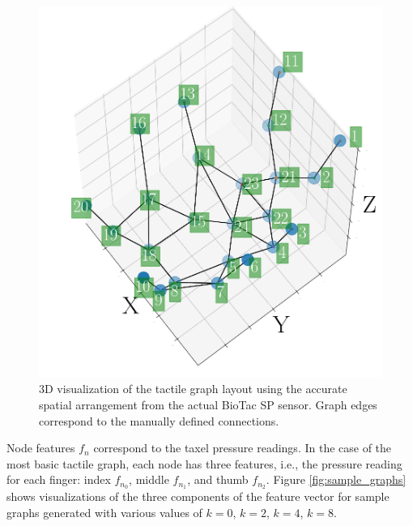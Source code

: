 \begin{figure}[!htb]
	\centering
    \includegraphics[width=0.8\linewidth]{Figures/Tactile/plot3d.png}
	\caption{3D visualization of the tactile graph layout using the accurate spatial arrangement from the actual BioTac SP sensor. Graph edges correspond to the manually defined connections.}
	\label{fig:graph_3d}
\end{figure}

Node features $f_n$ correspond to the taxel pressure readings. In the case of the most basic tactile graph, each node has three features, i.e., the pressure reading for each finger: index $f_{n_0}$, middle $f_{n_1}$, and thumb $f_{n_2}$. Figure \ref{fig:sample_graphs} shows visualizations of the three components of the feature vector for sample graphs generated with various values of $k=0$, $k=2$, $k=4$, $k=8$.


